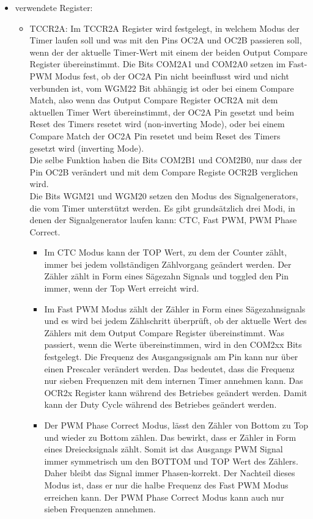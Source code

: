 \begin{itemize}
\item verwendete Register:
\begin{itemize}
\item TCCR2A: Im TCCR2A Register wird festgelegt, in welchem Modus der Timer laufen soll und was mit den Pins OC2A und OC2B passieren soll, wenn der der aktuelle Timer-Wert mit einem der beiden Output Compare Register übereinstimmt. Die Bits COM2A1 und COM2A0 setzen im Fast-\ac{PWM} Modus fest, ob der OC2A Pin nicht beeinflusst wird und nicht verbunden ist, vom WGM22 Bit abhängig ist oder bei einem Compare Match, also wenn das Output Compare Register OCR2A mit dem aktuellen Timer Wert übereinstimmt, der OC2A Pin gesetzt und beim Reset des Timers resetet wird (non-inverting Mode), oder bei einem Compare Match der OC2A Pin resetet und beim Reset des Timers gesetzt wird (inverting Mode). \\ Die selbe Funktion haben die Bits COM2B1 und COM2B0, nur dass der Pin OC2B verändert und mit dem Compare Registe OCR2B verglichen wird. \\
Die Bits WGM21 und WGM20 setzen den Modus des Signalgenerators, die vom Timer unterstützt werden. Es gibt grundsätzlich drei Modi, in denen der Signalgenerator laufen kann: CTC, Fast \ac{PWM}, \ac{PWM} Phase Correct. \\
\begin{itemize}
\item Im CTC Modus kann der TOP Wert, zu dem der Counter zählt, immer bei jedem vollständigen Zählvorgang geändert werden. Der Zähler zählt in Form eines Sägezahn Signals und toggled den Pin immer, wenn der Top Wert erreicht wird.\\
\item Im Fast \ac{PWM} Modus zählt der Zähler in Form eines Sägezahnsignals und es wird bei jedem Zählschritt überprüft, ob der aktuelle Wert des Zählers mit dem Output Compare Register übereinstimmt. Was passiert, wenn die Werte übereinstimmen, wird in den COM2xx Bits festgelegt. Die Frequenz des Ausgangssignals am Pin kann nur über einen Prescaler verändert werden. Das bedeutet, dass die Frequenz nur sieben Frequenzen mit dem internen Timer annehmen kann. Das OCR2x Register kann während des Betriebes geändert werden. Damit kann der Duty Cycle während des Betriebes geändert werden. \\
\item Der \ac{PWM} Phase Correct Modus, lässt den Zähler von Bottom zu Top und wieder zu Bottom zählen. Das bewirkt, dass er Zähler in Form eines Dreiecksignals zählt. Somit ist das Ausgangs \ac{PWM} Signal immer symmetrisch um den BOTTOM und TOP Wert des Zählers. Daher bleibt das Signal immer Phasen-korrekt. Der Nachteil dieses Modus ist, dass er nur die halbe Frequenz des Fast \ac{PWM} Modus erreichen kann. Der \ac{PWM} Phase Correct Modus kann auch nur sieben Frequenzen annehmen.\\

\end{itemize}
\end{itemize}
\end{itemize}
